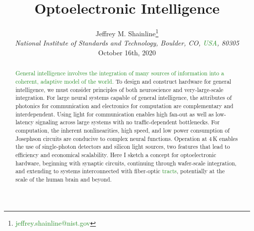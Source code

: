 \documentclass{article}
\title{Optoelectronic Intelligence}
\author[1]{\Large{Jeffrey M. Shainline\footnote{\textcolor{ForestGreen}{jeffrey.shainline@nist.gov}}}\\
\textit{\small National Institute of Standards and Technology, Boulder, CO, \textcolor{ForestGreen}{USA}, 80305}\\
\vspace{0.3em}
\small October 16th, 2020
}
\begin{document}
\maketitle

\begin{abstract}
\textcolor{ForestGreen}{General intelligence involves the integration of many sources of information into a coherent, adaptive model of the world.} To design and construct hardware for general intelligence, we must consider principles of both neuroscience and very-large-scale integration. For large neural systems capable of general intelligence, the attributes of photonics for communication and electronics for computation are complementary and interdependent. Using light for communication enables high fan-out as well as low-latency signaling across large systems with no traffic-dependent bottlenecks. For computation, the inherent nonlinearities, high speed, and low power consumption of Josephson circuits are conducive to complex neural functions. Operation at 4\,K enables the use of single-photon detectors and silicon light sources, two features that lead to efficiency and economical scalability. Here I sketch a concept for optoelectronic hardware, beginning with synaptic circuits, continuing through wafer-scale integration, and extending to systems interconnected with fiber-optic \textcolor{ForestGreen}{tracts}, potentially at the scale of the human brain and beyond.
\vspace{3em}
\end{abstract}
\end{document}

